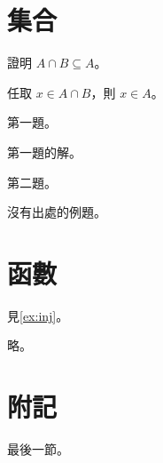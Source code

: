 \documentclass[lang=zh, thmnames=native, solutions=end]{akizumi-note}
\begin{document}
\section{集合}
\begin{exercise}
證明 $A\cap B\subseteq A$。
\end{exercise}
\begin{solution}
任取 $x\in A\cap B$，則 $x\in A$。
\end{solution}
\begin{exercises}
\item 第一題。
\begin{solution}
第一題的解。
\end{solution}
\item 第二題。
\end{exercises}
\begin{example-problem}[最短路徑]
沒有出處的例題。
\end{example-problem}
\section{函數}
\begin{exercise}[單射]\label{ex:inj}
見\cref{ex:inj}。
\end{exercise}
\begin{solution}
略。
\end{solution}
\printsolutions
\section{附記}
最後一節。
\end{document}
